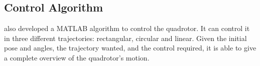 \subsection{Control Algorithm}

\citet{geronel2023} also developed a MATLAB algorithm to control the quadrotor. It can control it in three different trajectories: rectangular, circular and linear.
Given the initial pose and angles, the trajectory wanted, and the control required, it is able to give a complete overview of the quadrotor's motion.